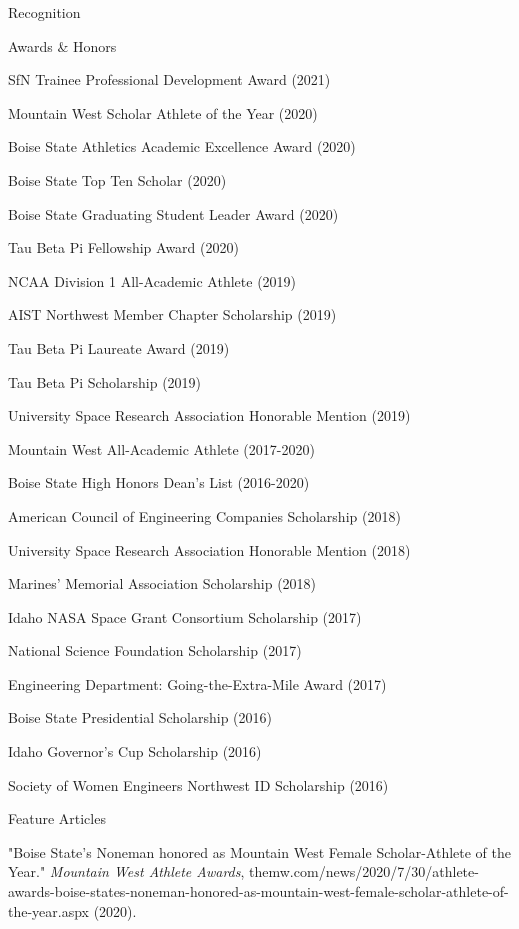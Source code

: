 \documentclass{resume} %
\begin{document}
\newpage
\begin{rSection}{Recognition}
\begin{rSubsection2}{Awards \& Honors}{}{}{}
\item SfN Trainee Professional Development Award (2021)
\item Mountain West Scholar Athlete of the Year (2020)
\item Boise State Athletics Academic Excellence Award (2020) 
\item Boise State Top Ten Scholar (2020)
\item Boise State Graduating Student Leader Award (2020)
\item Tau Beta Pi Fellowship Award (2020)
\item NCAA Division 1 All-Academic Athlete (2019) 
\item AIST Northwest Member Chapter Scholarship (2019)
\item Tau Beta Pi Laureate Award (2019)
\item Tau Beta Pi Scholarship (2019)
\item University Space Research Association Honorable Mention (2019)
\item Mountain West All-Academic Athlete (2017-2020)
\item Boise State High Honors Dean’s List (2016-2020)
\item American Council of Engineering Companies Scholarship (2018)
\item University Space Research Association Honorable Mention (2018)
\item Marines’ Memorial Association Scholarship (2018)
\item Idaho NASA Space Grant Consortium Scholarship (2017)
\item National Science Foundation Scholarship (2017)
\item Engineering Department: Going-the-Extra-Mile Award (2017)
\item Boise State Presidential Scholarship (2016)
\item Idaho Governor’s Cup Scholarship (2016)
\item Society of Women Engineers Northwest ID Scholarship (2016)
\end{rSubsection2}
\begin{rSubsection3}{Feature Articles}{}{}{}
\item "Boise State's Noneman honored as Mountain West Female Scholar-Athlete of the Year." \textit{Mountain West Athlete Awards}, themw.com/news/2020/7/30/athlete-awards-boise-states-noneman-honored-as-mountain-west-female-scholar-athlete-of-the-year.aspx (2020).

\end{rSubsection3}
\end{rSection}
\end{document}
